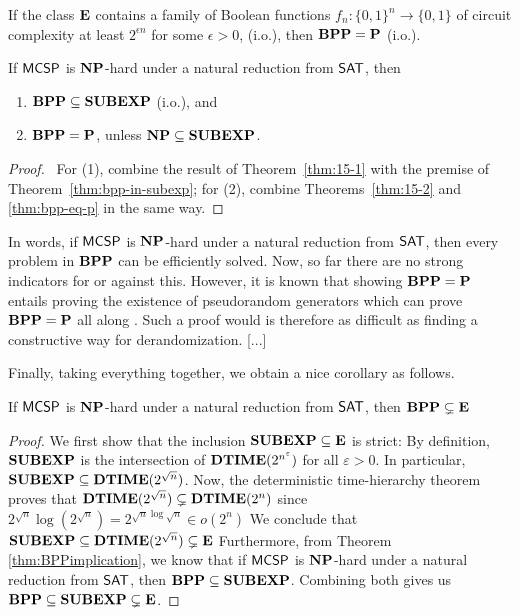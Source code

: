 \documentclass[11pt]{article}
\begin{document}
\begin{theorem}
  \label{thm:bpp-eq-p}
	If the class $\mathbf{E}$ contains a family of Boolean functions $f_n: \{0, 1\}^n \rightarrow \{0, 1\}$ of circuit complexity at least $2^{\epsilon n}$ for some $\epsilon > 0$, (i.o.), then $\mathbf{BPP} = \mathbf{P}$ (i.o.).
\end{theorem}

\begin{theorem}[\cite{10.1145/335305.335314}]
	\label{thm:BPPimplication}
	If $\mathsf{MCSP}$ is $\mathbf{NP}$-hard under a natural reduction from $\mathsf{SAT}$, then
	\begin{enumerate} [1.]
		\item $\mathbf{BPP} \subseteq \mathbf{SUBEXP}$ (i.o.), and
		\item $\mathbf{BPP} = \mathbf{P}$, unless $\mathbf{NP} \subseteq \mathbf{SUBEXP}$.
	\end{enumerate}
\end{theorem}

\begin{proof} \
  For (1), combine the result of Theorem~\ref{thm:15-1} with the premise of
  Theorem~\ref{thm:bpp-in-subexp};
  for (2), combine Theorems~\ref{thm:15-2} and \ref{thm:bpp-eq-p} in the same
  way.
\end{proof}

In words, if $\mathsf{MCSP}$ is $\mathbf{NP}$-hard under a natural reduction from
$\mathsf{SAT}$, then every problem in $\mathbf{BPP}$ can be efficiently solved.
Now, so far there are no strong indicators for or against this.
However, it is known that showing $\mathbf{BPP} = \mathbf{P}$ entails proving the existence
of pseudorandom generators which can prove $\mathbf{BPP} = \mathbf{P}$ all
along \cite{goldreich11}.
Such a proof would is therefore as difficult as finding a constructive way for
derandomization. [...]

Finally, taking everything together, we obtain a nice corollary as follows.

\begin{corollary}
	If $\mathsf{MCSP}$ is $\mathbf{NP}$-hard under a natural reduction from $\mathsf{SAT}$, then $\mathbf{BPP} \subsetneq \mathbf{E}$
\end{corollary}

\begin{proof}
  We first show that the inclusion $\mathbf{SUBEXP} \subseteq \mathbf{E}$ is
  strict:
  By definition, $\mathbf{SUBEXP}$ is the intersection of
  $\mathbf{DTIME}(2^{n^\varepsilon})$ for all $\varepsilon > 0$.
  In particular, $\mathbf{SUBEXP} \subseteq \mathbf{DTIME}(2^{\sqrt n})$.
  Now, the deterministic time-hierarchy theorem proves that
  $\mathbf{DTIME}(2^{\sqrt n}) \subsetneq \mathbf{DTIME}(2^{n})$ since
  $2^{\sqrt n} \log(2^{\sqrt n}) = 2^{\sqrt n \log \sqrt n}
   \in o(2^n)$
  We conclude that
  $\mathbf{SUBEXP} \subseteq \mathbf{DTIME}(2^{\sqrt n}) \subsetneq \mathbf{E}$
  Furthermore, from Theorem \ref{thm:BPPimplication}, we know that if
  $\mathsf{MCSP}$ is
  $\mathbf{NP}$-hard under a natural reduction from $\mathsf{SAT}$, then
  $\mathbf{BPP} \subseteq \mathbf{SUBEXP}$.
  Combining both gives us
  $\mathbf{BPP} \subseteq \mathbf{SUBEXP} \subsetneq \mathbf{E}$.
\end{proof}
\end{document}

